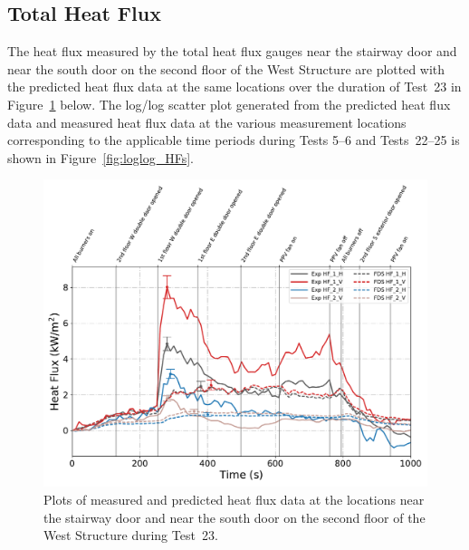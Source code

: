 \clearpage
\subsection{Total Heat Flux}
The heat flux measured by the total heat flux gauges near the stairway door and near the south door on the second floor of the West Structure are plotted with the predicted heat flux data at the same locations over the duration of Test~23 in Figure~\ref{fig:Test23_HFs} below. The log/log scatter plot generated from the predicted heat flux data and measured heat flux data at the various measurement locations corresponding to the applicable time periods during Tests 5--6 and Tests~22--25 is shown in Figure~\ref{fig:loglog_HFs}.  

\begin{figure}[!h]
	\centering
	\includegraphics[width=\columnwidth]{Figures/Plots/Validation/Heat_Flux/Test_23_HFs}
	\caption[Plots of measured and predicted heat flux data during Test~23.]{Plots of measured and predicted heat flux data at the locations near the stairway door and near the south door on the second floor of the West Structure during Test~23.}
	\label{fig:Test23_HFs}
\end{figure}

